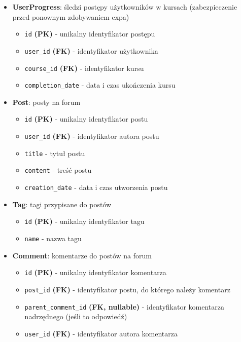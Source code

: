 \documentclass[11pt,a4paper]{article}
\numberwithin{equation}{section}
\begin{document}
\begin{itemize}
    \item \textbf{UserProgress}: śledzi postępy użytkowników w kursach (zabezpieczenie przed ponownym zdobywaniem expa)
        \begin{itemize}
            \item \texttt{id} \textbf{(PK)} - unikalny identyfikator postępu
            \item \texttt{user\_id} \textbf{(FK)} - identyfikator użytkownika
            \item \texttt{course\_id} \textbf{(FK)} - identyfikator kursu
            \item \texttt{completion\_date} - data i czas ukończenia kursu
        \end{itemize}
    \item \textbf{Post}: posty na forum
        \begin{itemize}
            \item \texttt{id} \textbf{(PK)} - unikalny identyfikator postu
            \item \texttt{user\_id} \textbf{(FK)} - identyfikator autora postu
            \item \texttt{title} - tytuł postu
            \item \texttt{content} - treść postu
            \item \texttt{creation\_date} - data i czas utworzenia postu
        \end{itemize}
    \item \textbf{Tag}: tagi przypisane do postów
        \begin{itemize}
            \item \texttt{id} \textbf{(PK)} - unikalny identyfikator tagu
            \item \texttt{name} - nazwa tagu
        \end{itemize}
    \item \textbf{Comment}: komentarze do postów na forum
        \begin{itemize}
            \item \texttt{id} \textbf{(PK)} - unikalny identyfikator komentarza
            \item \texttt{post\_id} \textbf{(FK)} - identyfikator postu, do którego należy komentarz
            \item \texttt{parent\_comment\_id} \textbf{(FK, nullable)} - identyfikator komentarza nadrzędnego (jeśli to odpowiedź)
            \item \texttt{user\_id} \textbf{(FK)} - identyfikator autora komentarza

\end{itemize}
\end{itemize}
\end{document}
